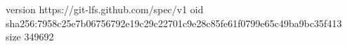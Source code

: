 version https://git-lfs.github.com/spec/v1
oid sha256:7958c25e7b06756792e19c29c22701c9e28c85fe61f0799e65c49ba9bc35f413
size 349692
